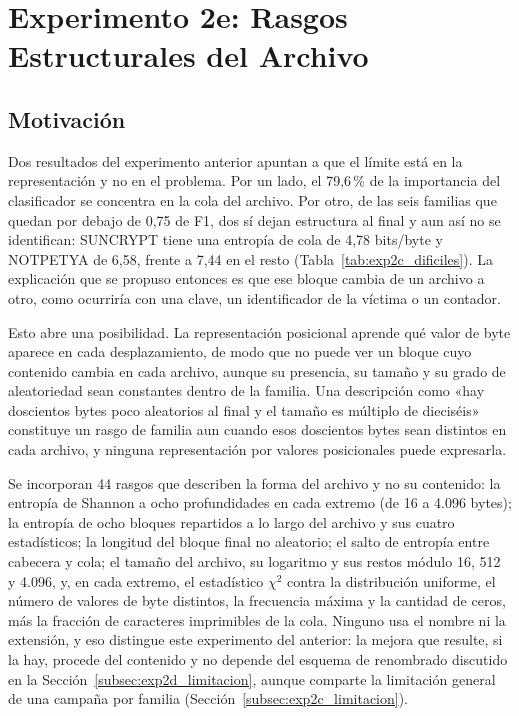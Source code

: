 \section{Experimento 2e: Rasgos Estructurales del Archivo}
\label{sec:exp2e}

\subsection{Motivación}

Dos resultados del experimento anterior apuntan a que el límite está en la representación y no en el problema. Por un lado, el 79,6\,\% de la importancia del clasificador se concentra en la cola del archivo. Por otro, de las seis familias que quedan por debajo de 0,75 de F1, dos sí dejan estructura al final y aun así no se identifican: SUNCRYPT tiene una entropía de cola de 4,78 bits/byte y NOTPETYA de 6,58, frente a 7,44 en el resto (Tabla~\ref{tab:exp2c_dificiles}). La explicación que se propuso entonces es que ese bloque cambia de un archivo a otro, como ocurriría con una clave, un identificador de la víctima o un contador.

Esto abre una posibilidad. La representación posicional aprende qué valor de byte aparece en cada desplazamiento, de modo que no puede ver un bloque cuyo contenido cambia en cada archivo, aunque su presencia, su tamaño y su grado de aleatoriedad sean constantes dentro de la familia. Una descripción como «hay doscientos bytes poco aleatorios al final y el tamaño es múltiplo de dieciséis» constituye un rasgo de familia aun cuando esos doscientos bytes sean distintos en cada archivo, y ninguna representación por valores posicionales puede expresarla.

Se incorporan 44 rasgos que describen la forma del archivo y no su contenido: la entropía de Shannon a ocho profundidades en cada extremo (de 16 a 4.096 bytes); la entropía de ocho bloques repartidos a lo largo del archivo y sus cuatro estadísticos; la longitud del bloque final no aleatorio; el salto de entropía entre cabecera y cola; el tamaño del archivo, su logaritmo y sus restos módulo 16, 512 y 4.096, y, en cada extremo, el estadístico $\chi^2$ contra la distribución uniforme, el número de valores de byte distintos, la frecuencia máxima y la cantidad de ceros, más la fracción de caracteres imprimibles de la cola. Ninguno usa el nombre ni la extensión, y eso distingue este experimento del anterior: la mejora que resulte, si la hay, procede del contenido y no depende del esquema de renombrado discutido en la Sección~\ref{subsec:exp2d_limitacion}, aunque comparte la limitación general de una campaña por familia (Sección~\ref{subsec:exp2c_limitacion}).

